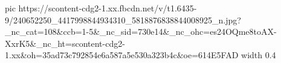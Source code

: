  
 
 
 
 

\ifcmt
  pic https://scontent-cdg2-1.xx.fbcdn.net/v/t1.6435-9/240652250_4417998844934310_5818876838844008925_n.jpg?_nc_cat=108&ccb=1-5&_nc_sid=730e14&_nc_ohc=es24OQme8toAX-XxrK5&_nc_ht=scontent-cdg2-1.xx&oh=35ad73c792854e6a587a5e530a323b4c&oe=614E5FAD
  width 0.4
\fi
